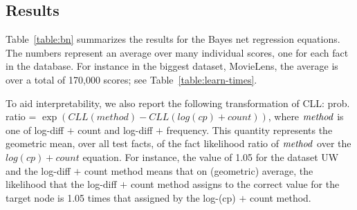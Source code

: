 \documentclass[runningheads,a4paper]{llncs}
\begin{document}
\subsection{Results} 

Table~\ref{table:bn} summarizes the results for the Bayes net regression equations. 
The numbers represent an average over many individual scores, one for each fact
in the database. 
For instance in the biggest dataset, MovieLens, the average is over a total of 170,000 scores; see Table~\ref{table:learn-times}. 

To aid interpretability, we also report the following transformation of CLL: prob. ratio = $\exp(CLL(method) - CLL(log(cp) + count))$,  where $\it{method}$ is one of log-diff $+$ count and log-diff $+$ frequency. This quantity represents the geometric mean, over all test facts, of the fact likelihood ratio of $\it{method}$  over the $log(cp) + count$ equation.
For instance, the value of 1.05 for the dataset UW and the log-diff $+$ count method means that on (geometric) average, the likelihood that the log-diff $+$ count method assigns to the correct value for the target node is 1.05 times that assigned by the log-(cp) $+$ count method.
\end{document}
